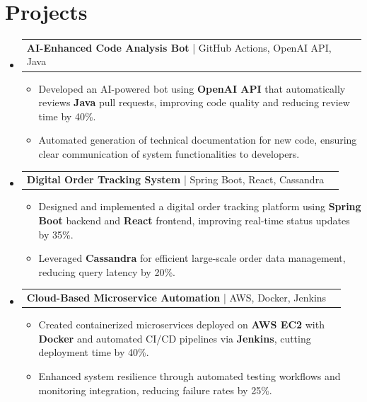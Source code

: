 \documentclass[letterpaper,11pt]{article}
\makeatletter
\newcommand{\resumeItem}[1]{
  \item\footnotesize{
    {#1 \vspace{-2pt}}
  }
}
\newcommand{\resumeProjectHeading}[2]{
    \item
    \begin{tabular*}{1.001\textwidth}{l@{\extracolsep{\fill}}r}
      \small#1 & \textbf{\small #2}\\
    \end{tabular*}\vspace{-7pt}
}
\newcommand{\resumeSubHeadingListStart}{\begin{itemize}[leftmargin=0pt, label={}]}
\newcommand{\resumeSubHeadingListEnd}{\end{itemize}}
\newcommand{\resumeItemListStart}{\begin{itemize}[leftmargin=*]}
\newcommand{\resumeItemListEnd}{\end{itemize}\vspace{-5pt}}
\makeatother
\begin{document}
\section{Projects}
    \vspace{-5pt}
    \resumeSubHeadingListStart
      \resumeProjectHeading
          {\textbf{AI-Enhanced Code Analysis Bot} | GitHub Actions, OpenAI API, Java}{}
          \resumeItemListStart
              \resumeItem{Developed an AI-powered bot using \textbf{OpenAI API} that automatically reviews \textbf{Java} pull requests, improving code quality and reducing review time by 40\%.}
              \resumeItem{Automated generation of technical documentation for new code, ensuring clear communication of system functionalities to developers.}
          \resumeItemListEnd
          \vspace{-12pt}
      \resumeProjectHeading
          {\textbf{Digital Order Tracking System} | Spring Boot, React, Cassandra}{}
          \resumeItemListStart
              \resumeItem{Designed and implemented a digital order tracking platform using \textbf{Spring Boot} backend and \textbf{React} frontend, improving real-time status updates by 35\%.}
              \resumeItem{Leveraged \textbf{Cassandra} for efficient large-scale order data management, reducing query latency by 20\%.}
          \resumeItemListEnd
          \vspace{-12pt}
      \resumeProjectHeading
          {\textbf{Cloud-Based Microservice Automation} | AWS, Docker, Jenkins}{}
          \resumeItemListStart
              \resumeItem{Created containerized microservices deployed on \textbf{AWS EC2} with \textbf{Docker} and automated CI/CD pipelines via \textbf{Jenkins}, cutting deployment time by 40\%.}
              \resumeItem{Enhanced system resilience through automated testing workflows and monitoring integration, reducing failure rates by 25\%.}
          \resumeItemListEnd 
    \resumeSubHeadingListEnd
\end{document}
